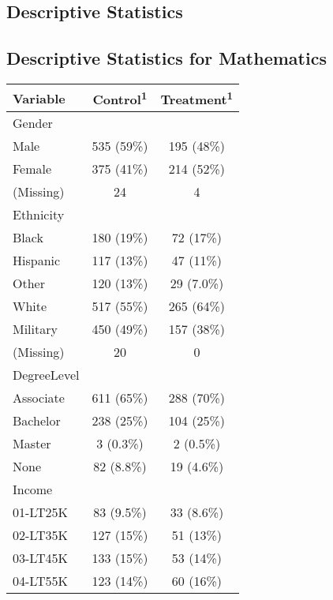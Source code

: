 \clearpage
\makeatletter
\efloat@restorefloats
\makeatother


\begin{appendix}
\hypertarget{descriptive-statistics}{%
\section{Descriptive Statistics}\label{descriptive-statistics}}

\hypertarget{descriptive-statistics-for-mathematics}{%
\subsection{Descriptive Statistics for
Mathematics}\label{descriptive-statistics-for-mathematics}}

\captionsetup[table]{labelformat=empty,skip=1pt}
\setlength{\LTpost}{0mm}
\begin{longtable}{lcc}
\toprule
\textbf{Variable} & \textbf{Control}\textsuperscript{1} & \textbf{Treatment}\textsuperscript{1} \\ 
\midrule
Gender &  &  \\ 
Male & 535 (59\%) & 195 (48\%) \\ 
Female & 375 (41\%) & 214 (52\%) \\ 
(Missing) & 24 & 4 \\ 
Ethnicity &  &  \\ 
Black & 180 (19\%) & 72 (17\%) \\ 
Hispanic & 117 (13\%) & 47 (11\%) \\ 
Other & 120 (13\%) & 29 (7.0\%) \\ 
White & 517 (55\%) & 265 (64\%) \\ 
Military & 450 (49\%) & 157 (38\%) \\ 
(Missing) & 20 & 0 \\ 
DegreeLevel &  &  \\ 
Associate & 611 (65\%) & 288 (70\%) \\ 
Bachelor & 238 (25\%) & 104 (25\%) \\ 
Master & 3 (0.3\%) & 2 (0.5\%) \\ 
None & 82 (8.8\%) & 19 (4.6\%) \\ 
Income &  &  \\ 
01-LT25K & 83 (9.5\%) & 33 (8.6\%) \\ 
02-LT35K & 127 (15\%) & 51 (13\%) \\ 
03-LT45K & 133 (15\%) & 53 (14\%) \\ 
04-LT55K & 123 (14\%) & 60 (16\%) \\ 

\end{longtable}
\end{appendix}
